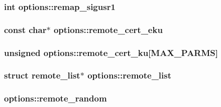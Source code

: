 \subsubsection[{remap\+\_\+sigusr1}]{\setlength{\rightskip}{0pt plus 5cm}int options\+::remap\+\_\+sigusr1}\label{structoptions_aeea9c1239f3809521b0dde3bcc622fc3}
\hypertarget{structoptions_a35efdd07abfdcad8904ed80f823be6b4}{}
\subsubsection[{remote\+\_\+cert\+\_\+eku}]{\setlength{\rightskip}{0pt plus 5cm}const char$\ast$ options\+::remote\+\_\+cert\+\_\+eku}\label{structoptions_a35efdd07abfdcad8904ed80f823be6b4}
\hypertarget{structoptions_a2f274b709207225b29461a422026c921}{}
\subsubsection[{remote\+\_\+cert\+\_\+ku}]{\setlength{\rightskip}{0pt plus 5cm}unsigned options\+::remote\+\_\+cert\+\_\+ku\mbox{[}{\bf M\+A\+X\+\_\+\+P\+A\+R\+M\+S}\mbox{]}}\label{structoptions_a2f274b709207225b29461a422026c921}
\hypertarget{structoptions_a66489088b6b873a31c218169faa90298}{}
\subsubsection[{remote\+\_\+list}]{\setlength{\rightskip}{0pt plus 5cm}struct {\bf remote\+\_\+list}$\ast$ options\+::remote\+\_\+list}\label{structoptions_a66489088b6b873a31c218169faa90298}
\hypertarget{structoptions_ad1253168302c07ba9e2c89e1bdff9547}{}
\subsubsection[{remote\+\_\+random}]{ options\+::remote\+\_\+random}\label{structoptions_ad1253168302c07ba9e2c89e1bdff9547}
\hypertarget{structoptions_a45bb6bb056b0755eed6445cd8fb07156}{}
